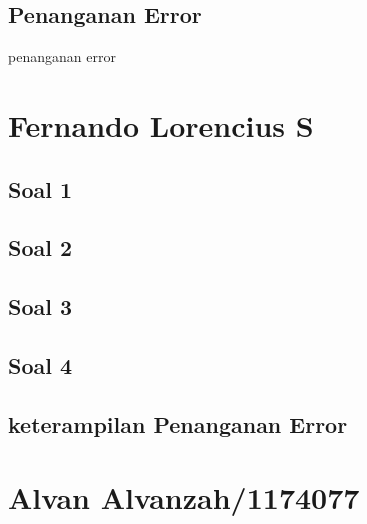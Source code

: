 \subsection{Penanganan Error}

\hfill \break

penanganan error


\section{Fernando Lorencius S}
\subsection{Soal 1}

\subsection{Soal 2}

\subsection{Soal 3}

\subsection{Soal 4}


\subsection{keterampilan Penanganan Error}


\section{Alvan Alvanzah/1174077}
